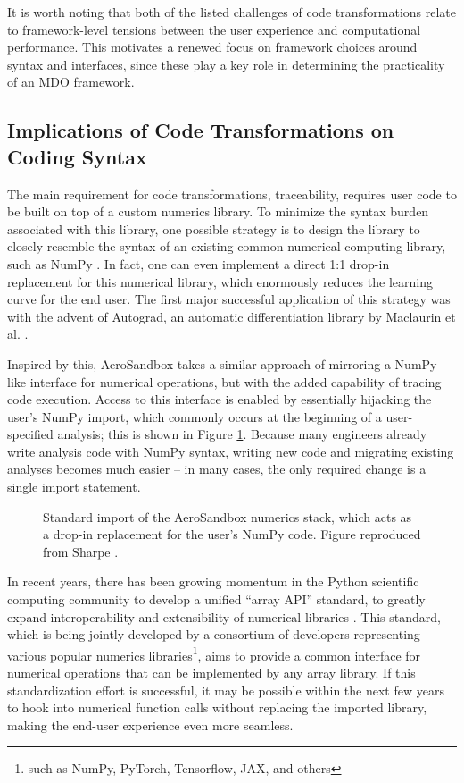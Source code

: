 It is worth noting that both of the listed challenges of code transformations relate to framework-level tensions between the user experience and computational performance. This motivates a renewed focus on framework choices around syntax and interfaces, since these play a key role in determining the practicality of an MDO framework.

\subsection{Implications of Code Transformations on Coding Syntax}
\label{sec:code_syntax}

The main requirement for code transformations, traceability, requires user code to be built on top of a custom numerics library. To minimize the syntax burden associated with this library, one possible strategy is to design the library to closely resemble the syntax of an existing common numerical computing library, such as NumPy \cite{harris_array_2020}. In fact, one can even implement a direct 1:1 drop-in replacement for this numerical library, which enormously reduces the learning curve for the end user. The first major successful application of this strategy was with the advent of Autograd, an automatic differentiation library by Maclaurin et al. \cite{maclaurin_autograd_2015}.

Inspired by this, AeroSandbox takes a similar approach of mirroring a NumPy-like interface for numerical operations, but with the added capability of tracing code execution. Access to this interface is enabled by essentially hijacking the user's NumPy import, which commonly occurs at the beginning of a user-specified analysis; this is shown in Figure \ref{fig:asb-np-import}. Because many engineers already write analysis code with NumPy syntax, writing new code and migrating existing analyses becomes much easier -- in many cases, the only required change is a single import statement.

\begin{figure}[H]
    \centering
    
    \caption{Standard import of the AeroSandbox numerics stack, which acts as a drop-in replacement for the user's NumPy code. Figure reproduced from Sharpe \cite{sharpe_aerosandbox_2021}.}
    \label{fig:asb-np-import}
\end{figure}

In recent years, there has been growing momentum in the Python scientific computing community to develop a unified ``array API'' standard, to greatly expand interoperability and extensibility of numerical libraries \cite{array_api_2023}. This standard, which is being jointly developed by a consortium of developers representing various popular numerics libraries\footnote{such as NumPy, PyTorch, Tensorflow, JAX, and others}, aims to provide a common interface for numerical operations that can be implemented by any array library. If this standardization effort is successful, it may be possible within the next few years to hook into numerical function calls without replacing the imported library, making the end-user experience even more seamless.

